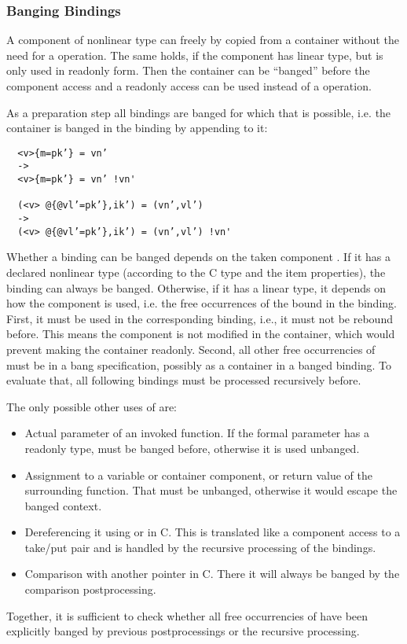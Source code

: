\subsubsection{Banging  Bindings}

A component of nonlinear type can freely by copied from a container without the need for a  operation. The same holds, if the 
component has linear type, but is only used in readonly form. Then the container can be ``banged'' before the component access and a readonly
access can be used instead of a  operation.

As a preparation step all  bindings are banged for which that is possible, i.e. the container is banged in the binding by appending
 to it:
\begin{verbatim}
  <v>{m=pk’} = vn’
  ->
  <v>{m=pk’} = vn’ !vn'

  (<v> @{@vl’=pk’},ik’) = (vn’,vl’)
  ->
  (<v> @{@vl’=pk’},ik’) = (vn’,vl’) !vn'
\end{verbatim}

Whether a  binding can be banged depends on the taken component . If it has a declared nonlinear type (according to the C 
type and the item properties), the  binding can always be banged. Otherwise, if it has a linear type, it depends on how the 
component  is used, i.e. the free occurrences of the  bound in the  binding. First, it must be used in 
the corresponding  binding, i.e., it must not be rebound before. This means the component is not modified in the container, 
which would prevent making the container readonly. Second, all other free occurrencies of  must be in a bang specification, 
possibly as a container in a banged  binding. To evaluate that, all following  bindings must be processed 
recursively before. 

The only possible other uses of  are:
\begin{itemize}
\item Actual parameter of an invoked function. If the formal parameter has a readonly type,  must be banged before,
otherwise it is used unbanged.
\item Assignment to a variable or container component, or return value of the surrounding function. That must be unbanged, 
otherwise it would escape the banged context.
\item Dereferencing it using \code{*} or \code{->} in C. This is translated like a component access to a take/put pair and is
handled by the recursive processing of the  bindings.
\item Comparison with another pointer in C. There it will always be banged by the comparison postprocessing.
\end{itemize}
Together, it is sufficient to check whether all free occurrencies of  have been explicitly banged by previous 
postprocessings or the recursive  processing.

